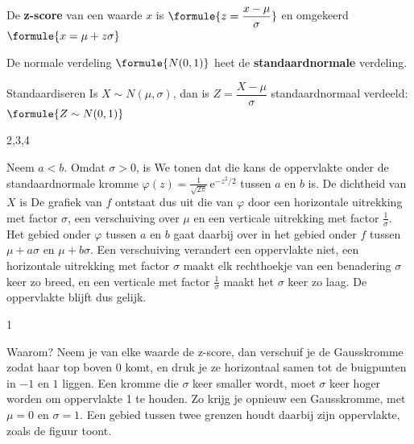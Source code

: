 \begin{theorie}
De \textbf{\textcolor{accent}{z-score}} van een waarde $x$ is \quad $\formule{z = \dfrac{x - \mu}{\sigma}}$ \qquad en omgekeerd \quad $\formule{x = \mu + z\sigma}$

\vspace{1mm}
De normale verdeling $\formule{N(0, 1)}$ heet de \textbf{\textcolor{accent}{standaardnormale}} verdeling.

\begin{stelling}{Standaardiseren}
Is $X \sim N(\mu, \sigma)$, dan is $Z = \dfrac{X - \mu}{\sigma}$ standaardnormaal verdeeld: \quad $\formule{Z \sim N(0, 1)}$
\end{stelling}
\begin{alleenvoor}{2,3,4}

\begin{bewijs}
Neem $a < b$. Omdat $\sigma > 0$, is
We tonen dat die kans de oppervlakte onder de standaardnormale kromme $\varphi(z) = \frac{1}{\sqrt{2\pi}}\,\mathrm{e}^{-z^2/2}$ tussen $a$ en $b$ is. De dichtheid van $X$ is
De grafiek van $f$ ontstaat dus uit die van $\varphi$ door een horizontale uitrekking met factor $\sigma$, een verschuiving over $\mu$ en een verticale uitrekking met factor $\frac{1}{\sigma}$. Het gebied onder $\varphi$ tussen $a$ en $b$ gaat daarbij over in het gebied onder $f$ tussen $\mu + a\sigma$ en $\mu + b\sigma$. Een verschuiving verandert een oppervlakte niet, een horizontale uitrekking met factor $\sigma$ maakt elk rechthoekje van een benadering $\sigma$ keer zo breed, en een verticale met factor $\frac{1}{\sigma}$ maakt het $\sigma$ keer zo laag. De oppervlakte blijft dus gelijk.
\end{bewijs}
\end{alleenvoor}
\end{theorie}
\begin{alleenvoor}{1}

Waarom? Neem je van elke waarde de z-score, dan verschuif je de Gausskromme zodat haar top boven 0 komt, en druk je ze horizontaal samen tot de buigpunten in $-1$ en $1$ liggen. Een kromme die $\sigma$ keer smaller wordt, moet $\sigma$ keer hoger worden om oppervlakte 1 te houden. Zo krijg je opnieuw een Gausskromme, met $\mu = 0$ en $\sigma = 1$. Een gebied tussen twee grenzen houdt daarbij zijn oppervlakte, zoals de figuur toont.
\end{alleenvoor}

